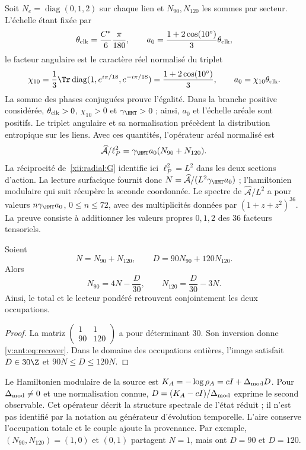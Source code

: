 Soit $N_e=\operatorname{diag}(0,1,2)$ sur chaque lien et
$N_{90},N_{120}$ les sommes par secteur. L'échelle étant fixée par
\[
\theta_{\rm clk}=\frac{C^*}{6}\frac{\pi}{180},\qquad
a_0=\frac{1+2\cos(10^\circ)}3\theta_{\rm clk},
\]
le facteur angulaire est le caractère réel normalisé du triplet
\begin{equation}
 \chi_{10}=\frac13\Tr\operatorname{diag}
       (1,e^{i\pi/18},e^{-i\pi/18})
 =\frac{1+2\cos(10^\circ)}3,
 \qquad a_0=\chi_{10}\theta_{\rm clk}.
 \label{v:ant:eq:ii-area-caracter-triplete}
\end{equation}
La somme des phases conjuguées prouve l'égalité. Dans la branche positive
considérée, \(\theta_{\rm clk}>0\), \(\chi_{10}>0\) et
\(\gamma_{\HMT}>0\) ; ainsi, \(a_0\) et l'échelle aréale sont
positifs. Le triplet angulaire et sa normalisation précèdent la
distribution entropique sur les liens. Avec ces quantités,
l'opérateur aréal normalisé est
\[
\widehat{\mathcal A}/\ell_P^2
=\gamma_{\HMT}a_0(N_{90}+N_{120}).
\]
La réciprocité de~\eqref{xii:radial:G} identifie ici \(\ell_P^2=L^2\) dans les deux sections d'action. La lecture surfacique fournit donc \(N=\widehat{\mathcal A}/(L^2\gamma_{\HMT}a_0)\) ; l'hamiltonien modulaire qui suit récupère la seconde coordonnée. Le spectre de \(\widehat{\mathcal A}/L^2\) a pour valeurs $n\gamma_{\HMT}a_0$, $0\le n\le72$, avec des multiplicités données par $(1+z+z^2)^{36}$. La preuve consiste à additionner les valeurs propres $0,1,2$ des 36 facteurs tensoriels.

\begin{theorem}
Soient
\[
N=N_{90}+N_{120},\qquad D=90N_{90}+120N_{120}.
\]
Alors
\begin{equation}
N_{90}=4N-\frac D{30},\qquad
N_{120}=\frac D{30}-3N.
\label{v:ant:eq:recover}
\end{equation}
Ainsi, le total et le lecteur pondéré retrouvent conjointement
les deux occupations.
\end{theorem}
\begin{proof}
La matriz $\left(\begin{smallmatrix}1&1\\90&120\end{smallmatrix}\right)$
a pour déterminant $30$. Son inversion donne \eqref{v:ant:eq:recover}.
Dans le domaine des occupations entières, l'image satisfait
$D\in30\Z$ et $90N\le D\le120N$.
\end{proof}

Le Hamiltonien modulaire de la source est
$K_A=-\log\rho_A=cI+\Delta_{\rm mod}D$.
Pour $\Delta_{\rm mod}\ne0$ et une normalisation connue,
$D=(K_A-cI)/\Delta_{\rm mod}$ exprime le second observable.
Cet opérateur décrit la structure spectrale de l’état réduit ;
il n’est pas identifié par la notation au générateur d’évolution temporelle.
L’aire conserve l’occupation totale et le couple ajoute la provenance.
Par exemple, $(N_{90},N_{120})=(1,0)$ et $(0,1)$ partagent $N=1$,
mais ont $D=90$ et $D=120$.

